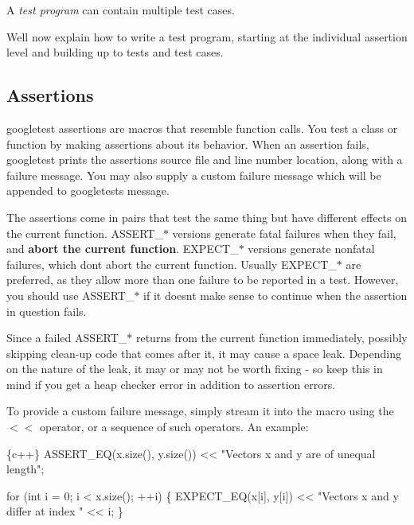 A {\itshape test program} can contain multiple test cases.

We\textquotesingle{}ll now explain how to write a test program, starting at the individual assertion level and building up to tests and test cases.

\subsection*{Assertions}

googletest assertions are macros that resemble function calls. You test a class or function by making assertions about its behavior. When an assertion fails, googletest prints the assertion\textquotesingle{}s source file and line number location, along with a failure message. You may also supply a custom failure message which will be appended to googletest\textquotesingle{}s message.

The assertions come in pairs that test the same thing but have different effects on the current function. {\ttfamily A\+S\+S\+E\+R\+T\+\_\+$\ast$} versions generate fatal failures when they fail, and {\bfseries abort the current function}. {\ttfamily E\+X\+P\+E\+C\+T\+\_\+$\ast$} versions generate nonfatal failures, which don\textquotesingle{}t abort the current function. Usually {\ttfamily E\+X\+P\+E\+C\+T\+\_\+$\ast$} are preferred, as they allow more than one failure to be reported in a test. However, you should use {\ttfamily A\+S\+S\+E\+R\+T\+\_\+$\ast$} if it doesn\textquotesingle{}t make sense to continue when the assertion in question fails.

Since a failed {\ttfamily A\+S\+S\+E\+R\+T\+\_\+$\ast$} returns from the current function immediately, possibly skipping clean-\/up code that comes after it, it may cause a space leak. Depending on the nature of the leak, it may or may not be worth fixing -\/ so keep this in mind if you get a heap checker error in addition to assertion errors.

To provide a custom failure message, simply stream it into the macro using the {\ttfamily $<$$<$} operator, or a sequence of such operators. An example\+:


\begin{DoxyCode}
\{c++\}
ASSERT\_EQ(x.size(), y.size()) << "Vectors x and y are of unequal length";

for (int i = 0; i < x.size(); ++i) \{
  EXPECT\_EQ(x[i], y[i]) << "Vectors x and y differ at index " << i;
\}
\end{DoxyCode}


